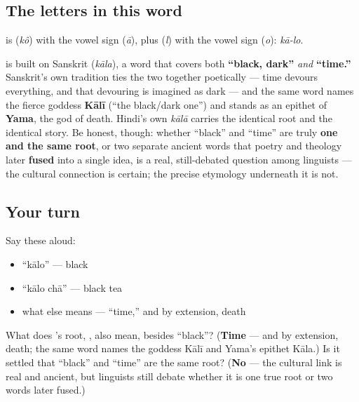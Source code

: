 \subsection*{The letters in this word}
\textbf{} is \textbf{} (\emph{kô}) with the vowel sign \textbf{} (\emph{ā}), plus \textbf{} (\emph{l}) with the vowel sign \textbf{} (\emph{o}): \emph{kā-lo}.

\begin{cousinweb}
\textbf{} is built on Sanskrit \textbf{} (\emph{kāla}), a word that covers both \textbf{\textquotedblleft{}black, dark\textquotedblright{}} \emph{and} \textbf{\textquotedblleft{}time.\textquotedblright{}} Sanskrit's own tradition ties the two together poetically — time devours everything, and that devouring is imagined as dark — and the same word names the fierce goddess \textbf{Kālī} (\textquotedblleft{}the black/dark one\textquotedblright{}) and stands as an epithet of \textbf{Yama}, the god of death. Hindi's own \emph{kālā} carries the identical root and the identical story. Be honest, though: whether \textquotedblleft{}black\textquotedblright{} and \textquotedblleft{}time\textquotedblright{} are truly \textbf{one and the same root}, or two separate ancient words that poetry and theology later \textbf{fused} into a single idea, is a real, still-debated question among linguists — the cultural connection is certain; the precise etymology underneath it is not.
\end{cousinweb}

\subsection*{Your turn}
Say these aloud:

\begin{itemize}
\raggedright
  \item \textquotedblleft{}kālo\textquotedblright{} — black
  \item \textquotedblleft{}kālo chā\textquotedblright{} — black tea
  \item what else  means — \textquotedblleft{}time,\textquotedblright{} and by extension, death
\end{itemize}

\begin{tcolorbox}[breakable,colback=teal!4,colframe=teal!35!black,title={Before you move on}]
What does 's root, , also mean, besides \textquotedblleft{}black\textquotedblright{}? (\textbf{Time} — and by extension, death; the same word names the goddess Kālī and Yama's epithet Kāla.) Is it settled that \textquotedblleft{}black\textquotedblright{} and \textquotedblleft{}time\textquotedblright{} are the same root? (\textbf{No} — the cultural link is real and ancient, but linguists still debate whether it is one true root or two words later fused.)
\end{tcolorbox}
